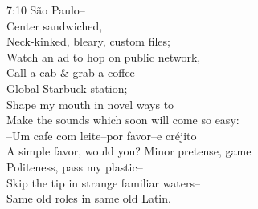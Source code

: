 

7:10 São Paulo-- \\
Center sandwiched, \\
Neck-kinked, bleary, custom files; \\
Watch an ad to hop on public network, \\
Call a cab \& grab a coffee \\
Global Starbuck station; \\
Shape my mouth in novel ways to \\
Make the sounds which soon will come so easy: \\
--Um cafe com leite--por favor--e créjito \\
A simple favor, would you? Minor pretense, game \\
Politeness, pass my plastic-- \\
Skip the tip in strange familiar waters-- \\
Same old roles in same old Latin.